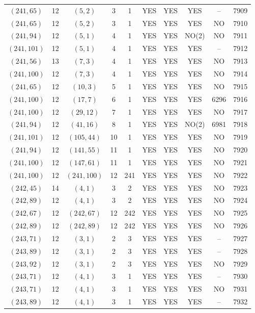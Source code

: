 \begin{longtable}{|c|c|c|c|c|c|c|c|c|c|}
$(241, 65)$ & 12 & $(5, 2)$ & 3 & 1 & YES & YES & YES & -- & 7909\\
$(241, 65)$ & 12 & $(5, 2)$ & 3 & 1 & YES & YES & YES & NO & 7910\\
$(241, 94)$ & 12 & $(5, 1)$ & 4 & 1 & YES & YES & NO(2) & NO & 7911\\
$(241, 101)$ & 12 & $(5, 1)$ & 4 & 1 & YES & YES & YES & -- & 7912\\
$(241, 56)$ & 13 & $(7, 3)$ & 4 & 1 & YES & YES & YES & NO & 7913\\
$(241, 100)$ & 12 & $(7, 3)$ & 4 & 1 & YES & YES & YES & NO & 7914\\
$(241, 65)$ & 12 & $(10, 3)$ & 5 & 1 & YES & YES & YES & NO & 7915\\
$(241, 100)$ & 12 & $(17, 7)$ & 6 & 1 & YES & YES & YES & 6296 & 7916\\
$(241, 100)$ & 12 & $(29, 12)$ & 7 & 1 & YES & YES & YES & NO & 7917\\
$(241, 94)$ & 12 & $(41, 16)$ & 8 & 1 & YES & YES & NO(2) & 6981 & 7918\\
$(241, 101)$ & 12 & $(105, 44)$ & 10 & 1 & YES & YES & YES & NO & 7919\\
$(241, 94)$ & 12 & $(141, 55)$ & 11 & 1 & YES & YES & YES & NO & 7920\\
$(241, 100)$ & 12 & $(147, 61)$ & 11 & 1 & YES & YES & YES & NO & 7921\\
$(241, 100)$ & 12 & $(241, 100)$ & 12 & 241 & YES & YES & YES & NO & 7922\\
$(242, 45)$ & 14 & $(4, 1)$ & 3 & 2 & YES & YES & YES & NO & 7923\\
$(242, 89)$ & 12 & $(4, 1)$ & 3 & 2 & YES & YES & YES & NO & 7924\\
$(242, 67)$ & 12 & $(242, 67)$ & 12 & 242 & YES & YES & YES & NO & 7925\\
$(242, 89)$ & 12 & $(242, 89)$ & 12 & 242 & YES & YES & YES & NO & 7926\\
$(243, 71)$ & 12 & $(3, 1)$ & 2 & 3 & YES & YES & YES & -- & 7927\\
$(243, 89)$ & 12 & $(3, 1)$ & 2 & 3 & YES & YES & YES & -- & 7928\\
$(243, 92)$ & 12 & $(3, 1)$ & 2 & 3 & YES & YES & YES & NO & 7929\\
$(243, 71)$ & 12 & $(4, 1)$ & 3 & 1 & YES & YES & YES & -- & 7930\\
$(243, 71)$ & 12 & $(4, 1)$ & 3 & 1 & YES & YES & YES & NO & 7931\\
$(243, 89)$ & 12 & $(4, 1)$ & 3 & 1 & YES & YES & YES & -- & 7932\\

\end{longtable}
